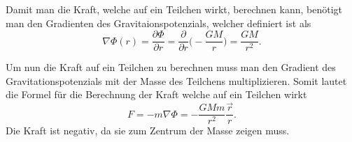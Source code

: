 Damit man die Kraft, welche auf ein Teilchen wirkt, berechnen kann, benötigt man den Gradienten des Gravitaionspotenzials, welcher definiert ist als
\begin{equation*}
	\nabla \Phi (r) = \frac{\partial \Phi}{\partial r} = \frac{\partial}{\partial r} \biggl( -\frac{GM}{r} \biggr) = \frac{GM}{r^2}.
\end{equation*}

Um nun die Kraft auf ein Teilchen zu berechnen muss man den Gradient des Gravitationspotenzials mit der Masse des Teilchens multiplizieren.
Somit lautet die Formel für die Berechnung der Kraft welche auf ein Teilchen wirkt
\begin{equation*}
	F = -m\nabla \Phi = -\frac{GMm}{r^2} \frac{\vec{r}}{r}.
\end{equation*}
Die Kraft ist negativ, da sie zum Zentrum der Masse zeigen muss.



